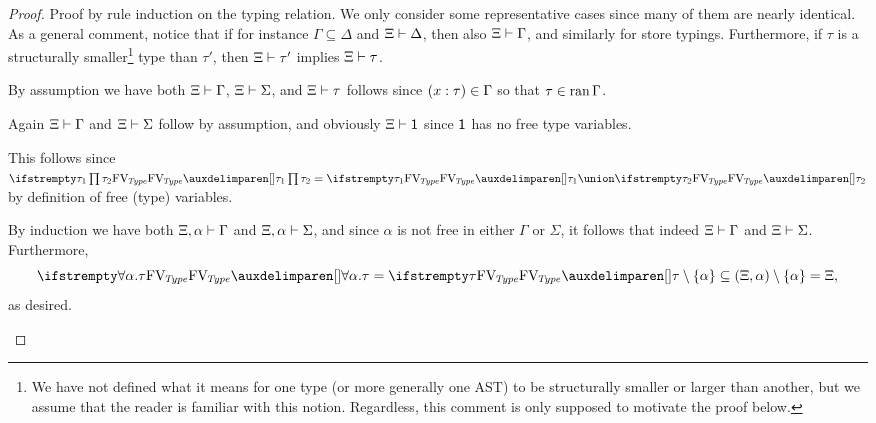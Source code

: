 \begin{proof}
Proof by rule induction on the typing relation. We only consider some representative cases since many of them are nearly identical. As a general comment, notice that if for instance $\Gamma \subseteq \Delta$ and $\Xi \vdash \Delta$, then also $\Xi \vdash \Gamma$, and similarly for store typings. Furthermore, if $\tau$ is a structurally smaller\footnote{We have not defined what it means for one type (or more generally one AST) to be structurally smaller or larger than another, but we assume that the reader is familiar with this notion. Regardless, this comment is only supposed to motivate the proof below.} type than $\tau'$, then $\Xi \vdash \tau'$ implies $\Xi \vdash \tau$.
%
\begin{proofsec}
    \item[\ruleref{Tvar}]
    By assumption we have both $\Xi \vdash \Gamma$, $\Xi \vdash \Sigma$, and $\Xi \vdash \tau$ follows since $\hastype*{x}{\tau} \in \Gamma$ so that $\tau \in \operatorname{ran}{\Gamma}$.

    \item[\ruleref{Tunit}]
    Again $\Xi \vdash \Gamma$ and $\Xi \vdash \Sigma$ follow by assumption, and obviously $\Xi \vdash \mathsf{1}$ since $\mathsf{1}$ has no free type variables.

    \item[\ruleref{Tpair}]
    This follows since $\freeTvar{\typeProd{\tau_1}{\tau_2}} = \freeTvar{\tau_1} \union \freeTvar{\tau_2}$ by definition of free (type) variables.

    \item[\ruleref{TTlam}]
    By induction we have both $\Xi,\alpha \vdash \Gamma$ and $\Xi,\alpha \vdash \Sigma$, and since $\alpha$ is not free in either $\Gamma$ or $\Sigma$, it follows that indeed $\Xi \vdash \Gamma$ and $\Xi \vdash \Sigma$. Furthermore,
    \begin{equation*}
        \freeTvar{\typeForall{\alpha}{\tau}}
            = \freeTvar{\tau} \setminus \{\alpha\}
            \subseteq (\Xi, \alpha) \setminus \{\alpha\}
            = \Xi, 
    \end{equation*}
    as desired.


\end{proofsec}
\end{proof}
